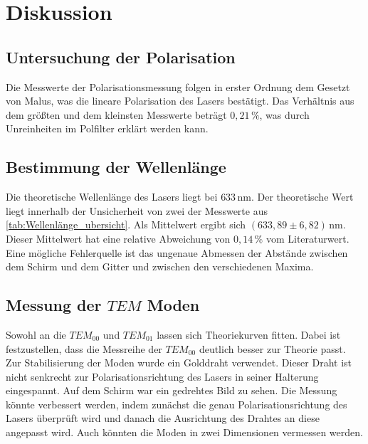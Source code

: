 \section{Diskussion}
\label{sec:Diskussion}



\subsection{Untersuchung der Polarisation}
\label{sec:Polarisation}

Die Messwerte der Polarisationsmessung folgen in erster Ordnung dem Gesetzt von Malus, was die lineare Polarisation des Lasers bestätigt.
Das Verhältnis aus dem größten und dem kleinsten Messwerte beträgt $0,21 \,\% $, was durch Unreinheiten im Polfilter erklärt werden kann.

\subsection{Bestimmung der Wellenlänge}
\label{sec:Wellenlänge}

Die theoretische Wellenlänge des Lasers liegt bei $633 \,\unit{\nano\meter}$\cite{eicheich}. Der theoretische Wert liegt innerhalb der Unsicherheit von zwei der Messwerte aus \autoref{tab:Wellenlänge_ubersicht}.
Als Mittelwert ergibt sich $ \left( 633,89 \pm 6,82 \right) \,\unit{\nano\meter}$. Dieser Mittelwert hat eine relative Abweichung von $ 0,14 \,\% $ vom Literaturwert.
Eine mögliche Fehlerquelle ist das ungenaue Abmessen der Abstände zwischen dem Schirm und dem Gitter und zwischen den verschiedenen Maxima. 


\subsection{Messung der $TEM$ Moden}
\label{sec:TEM_moden}
Sowohl an die $TEM_{00}$ und $TEM_{01}$ lassen sich Theoriekurven fitten. Dabei ist festzustellen, dass die Messreihe der $TEM_{00}$ deutlich besser zur Theorie passt.
Zur Stabilisierung der Moden wurde ein Golddraht verwendet. Dieser Draht ist nicht senkrecht zur Polarisationsrichtung des Lasers in seiner Halterung eingespannt.
Auf dem Schirm war ein gedrehtes Bild zu sehen. Die Messung könnte verbessert werden, indem zunächst die genau Polarisationsrichtung des Lasers überprüft wird und danach die Ausrichtung des Drahtes an diese angepasst wird.    
Auch könnten die Moden in zwei Dimensionen vermessen werden.

